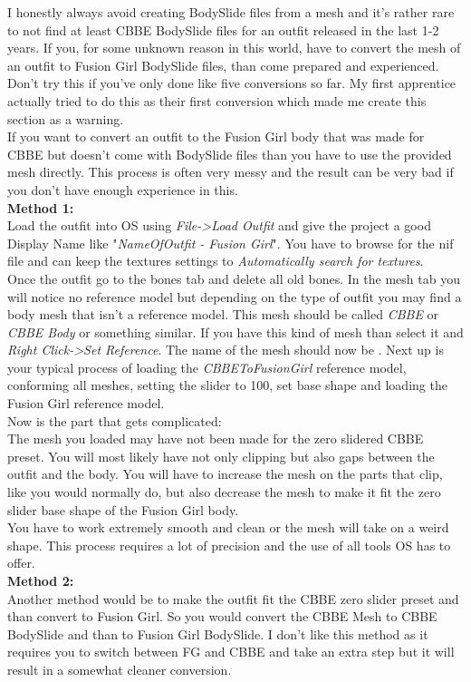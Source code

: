 I honestly always avoid creating BodySlide files from a mesh and it's rather rare to not find at least CBBE BodySlide files for an outfit 
released in the last 1-2 years. If you, for some unknown reason in this world, have to convert the mesh of an outfit to Fusion Girl BodySlide files,
than come prepared and experienced. Don't try this if you've only done like five conversions so far. My first apprentice actually 
tried to do this as their first conversion which made me create this section as a warning.\\
If you want to convert an outfit to the Fusion Girl body that was made for CBBE but doesn't come with BodySlide files than 
you have to use the provided mesh directly. This process is often very messy and the result can be very bad if you don't have
enough experience in this.\\
\textbf{Method 1:}\\
Load the outfit into OS using \textit{File->Load Outfit} and give the project a good Display Name like "\textit{NameOfOutfit - Fusion Girl}".
You have to browse for the nif file and can keep the textures settings to \textit{Automatically search for textures}.\\
Once the outfit go to the bones tab and delete all old bones. In the mesh tab you will notice no reference model but depending 
on the type of outfit you may find a body mesh that isn't a reference model. This mesh should be called \textit{CBBE} or \textit{CBBE Body} 
or something similar. If you have this kind of mesh than select it and \textit{Right Click->Set Reference}. The name of the mesh 
should now be {\color{green}{green}}. Next up is your typical process of loading the \textit{CBBEToFusionGirl} reference model, conforming 
all meshes, setting the slider to 100, set base shape and loading the Fusion Girl reference model.\\
Now is the part that gets complicated:\\
The mesh you loaded may have not been made for the zero slidered CBBE preset. You will most likely have not only clipping but also 
gaps between the outfit and the body. You will have to increase the mesh on the parts that clip, like you would normally do, but 
also decrease the mesh to make it fit the zero slider base shape of the Fusion Girl body.\\
You have to work extremely smooth and clean or the mesh will take on a weird shape. This process requires a lot of precision and the use 
of all tools OS has to offer.\\
\textbf{Method 2:}\\
Another method would be to make the outfit fit the CBBE zero slider preset and than convert to Fusion Girl. So you would convert the 
CBBE Mesh to CBBE BodySlide and than to Fusion Girl BodySlide. I don't like this method as it requires you to switch between FG and CBBE 
and take an extra step but it will result in a somewhat cleaner conversion.\\